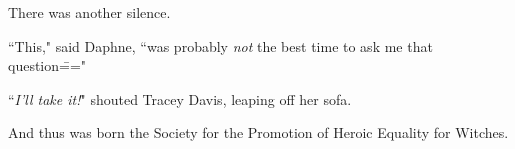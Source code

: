 There was another silence.

``This," said Daphne, ``was probably \emph{not} the best time to ask me that question\==="

``\emph{I'll take it!}" shouted Tracey Davis, leaping off her sofa.

\later

And thus was born the Society for the Promotion of Heroic Equality for Witches.

